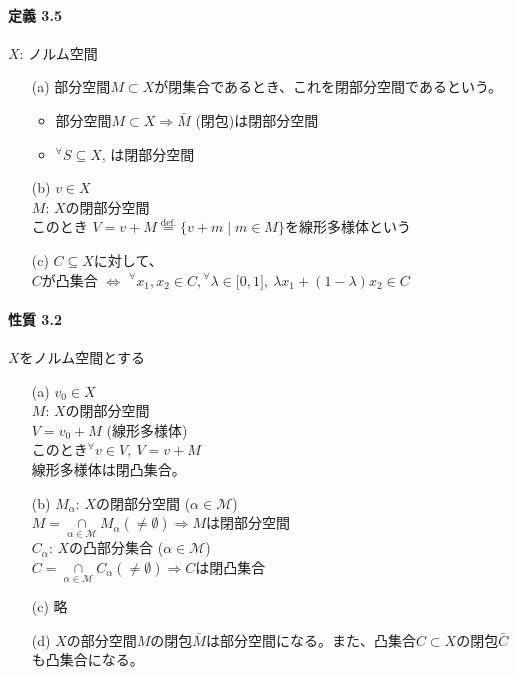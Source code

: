 \documentclass[12pt,a4paper]{article}
\begin{document}
  \paragraph{定義 3.5}
    $X$: ノルム空間
    \begin{itemize}
      \item[(a)] 部分空間$M \subset X$が閉集合であるとき、これを閉部分空間であるという。
        \begin{itemize}
          \item 部分空間$M \subset X \Rightarrow \bar{M}$ (閉包)は閉部分空間 
          \item ${}^\forall S \subseteq X$, は閉部分空間
        \end{itemize}
      \item[(b)] $v \in X$ \\ $M$: $X$の閉部分空間 \\ このとき $V = v + M \overset{\text{def.}}{=} \lbrace v + m \mid m \in M  \rbrace$を線形多様体という
      \item[(c)] $C \subseteq X$に対して、\\ $C$が凸集合 $\Leftrightarrow$ ${}^\forall x_1, x_2 \in C, {}^\forall \lambda \in \lbrack 0, 1\rbrack, \ \lambda x_1 + (1 - \lambda) x_2 \in C$
    \end{itemize}

  \paragraph{性質 3.2}
    $X$をノルム空間とする
    \begin{itemize}
      \item[(a)] $v_0 \in X$ \\ $M$: $X$の閉部分空間 \\ $V = v_0 + M$ (線形多様体) \\ このとき${}^\forall v \in V, \ V = v + M$ \\ 線形多様体は閉凸集合。
      \item[(b)] $M_\alpha$: $X$の閉部分空間 ($\alpha \in \mathcal{M}$) \\ $M = \underset{\alpha \in \mathcal{M}}{\cap} M_\alpha (\neq \emptyset) \Rightarrow M$は閉部分空間 \\
                 $C_\alpha$: $X$の凸部分集合 ($\alpha \in \mathcal{M}$) \\ $C = \underset{\alpha \in \mathcal{M}}{\cap} C_\alpha (\neq \emptyset) \Rightarrow C$は閉凸集合 \\
      \item[(c)] 略
      \item[(d)] $X$の部分空間$M$の閉包$\bar{M}$は部分空間になる。また、凸集合$C \subset X$の閉包$\bar{C}$も凸集合になる。
    \end{itemize}
\end{document}
